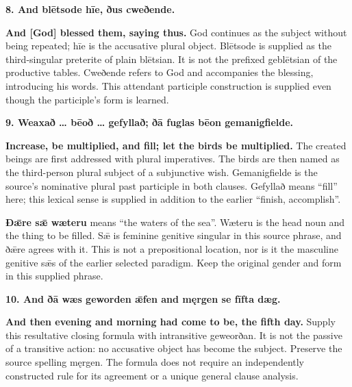 \textbf{8. And blētsode hīe, ðus cweðende.}

\textbf{And [God] blessed them, saying thus.} God continues as the subject without being repeated; hīe is the accusative plural object. Blētsode is supplied as the third-singular preterite of plain blētsian. It is not the prefixed geblētsian of the productive tables. Cweðende refers to God and accompanies the blessing, introducing his words. This attendant participle construction is supplied even though the participle’s form is learned.

\textbf{9. Weaxað … bēoð … gefyllað; ðā fuglas bēon gemanigfielde.}

\textbf{Increase, be multiplied, and fill; let the birds be multiplied.} The created beings are first addressed with plural imperatives. The birds are then named as the third-person plural subject of a subjunctive wish. Gemanigfielde is the source’s nominative plural past participle in both clauses. Gefyllað means “fill” here; this lexical sense is supplied in addition to the earlier “finish, accomplish”.

\textbf{Ðǣre sǣ wæteru} means “the waters of the sea”. Wæteru is the head noun and the thing to be filled. Sǣ is feminine genitive singular in this source phrase, and ðǣre agrees with it. This is not a prepositional location, nor is it the masculine genitive sǣs of the earlier selected paradigm. Keep the original gender and form in this supplied phrase.

\textbf{10. And ðā wæs geworden ǣfen and męrgen se fīfta dæg.}

\textbf{And then evening and morning had come to be, the fifth day.} Supply this resultative closing formula with intransitive geweorðan. It is not the passive of a transitive action: no accusative object has become the subject. Preserve the source spelling męrgen. The formula does not require an independently constructed rule for its agreement or a unique general clause analysis.

